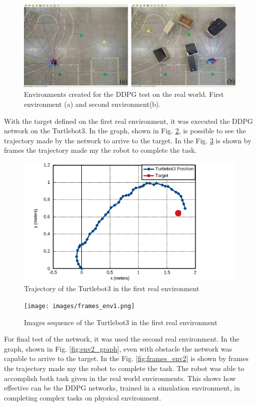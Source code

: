 \begin{figure}[H]
\centerline{\includegraphics[width=12cm]{images/real_envs.png}}
\caption{Environments created for the DDPG test on the real world. First environment (a) and second environment(b).}
\label{fig:real_envs}
\end{figure}

With the target defined on the first real environment, it was executed the DDPG network on the Turtlebot3.
In the graph, shown in Fig. \ref{fig:env1_graph}, is possible to see the trajectory made by the network to arrive to the target.
In the Fig. \ref{fig:frames_env1} is shown by frames the trajectory made my the robot to complete the task.

\begin{figure}[H]
\centerline{\includegraphics[width=12cm]{images/env1_graph.png}}
\caption{Trajectory of the Turtlebot3 in the first real environment}
\label{fig:env1_graph}
\end{figure}

\begin{figure}[H]
\centerline{\texttt{[image: images/frames\_env1.png]}}
\caption{Images sequence of the Turtlebot3 in the first real environment}
\label{fig:frames_env1}
\end{figure}

For final test of the network, it was used the second real environment. In the graph, shown in Fig. \ref{fig:env2_graph}, even with obstacle the network was capable to arrive to the target. In the Fig. \ref{fig:frames_env2} is shown by frames the trajectory made my the robot to complete the task. %
The robot was able to accomplish both task given in the real world environments.
This shows how effective can be the DDPG networks, trained in a simulation environment, in completing complex tasks on physical environment.

